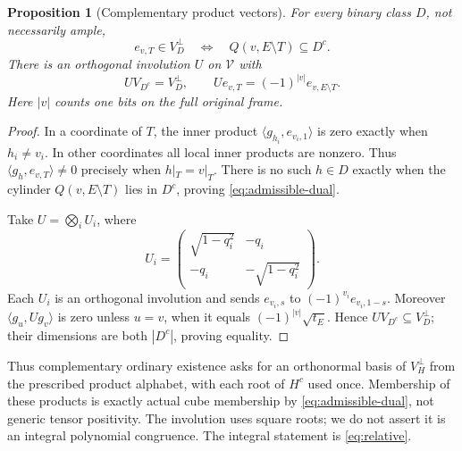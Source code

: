 \documentclass[11pt]{article}
\newtheorem{proposition}[theorem]{Proposition}
\theoremstyle{definition}
\begin{document}
\begin{proposition}[Complementary product vectors]\label{prop:dual}
For every binary class $D$, not necessarily ample,
\begin{equation}\label{eq:admissible-dual}
 e_{v,T}\in V_D^\perp
 \quad\Longleftrightarrow\quad Q(v,E\setminus T)\subseteq D^c.
\end{equation}
There is an orthogonal involution $U$ on $\mathcal V$ with
\begin{equation}\label{eq:dual-involution}
 UV_{D^c}=V_D^\perp,\qquad
 Ue_{v,T}=(-1)^{|v|}e_{v,E\setminus T}.
\end{equation}
Here $|v|$ counts one bits on the full original frame.
\end{proposition}
\begin{proof}
In a coordinate of $T$, the inner product $\langle g_{h_i},e_{v_i,1}\rangle$
is zero exactly when $h_i\ne v_i$. In other coordinates all local inner
products are nonzero. Thus $\langle g_h,e_{v,T}\rangle\ne0$ precisely
when $h|_T=v|_T$. There is no such $h\in D$ exactly when the cylinder
$Q(v,E\setminus T)$ lies in $D^c$, proving \eqref{eq:admissible-dual}.

Take $U=\bigotimes_i U_i$, where
\[
 U_i=\begin{pmatrix}\sqrt{1-q_i^2}&-q_i\\-q_i&-\sqrt{1-q_i^2}\end{pmatrix}.
\]
Each $U_i$ is an orthogonal involution and sends
$e_{v_i,s}$ to $(-1)^{v_i}e_{v_i,1-s}$. Moreover
$\langle g_u,Ug_v\rangle$ is zero unless $u=v$, when it equals
$(-1)^{|v|}\sqrt{t_E}$. Hence $UV_{D^c}\subseteq V_D^\perp$;
their dimensions are both $|D^c|$, proving equality.
\end{proof}

Thus complementary ordinary existence asks for an orthonormal basis of
$V_H^\perp$ from the prescribed product alphabet, with each root of
$H^c$ used once. Membership of these products is exactly actual cube
membership by \eqref{eq:admissible-dual}, not generic tensor positivity.
The involution uses square roots; we do not assert it is an integral
polynomial congruence. The integral statement is \eqref{eq:relative}.
\end{document}
